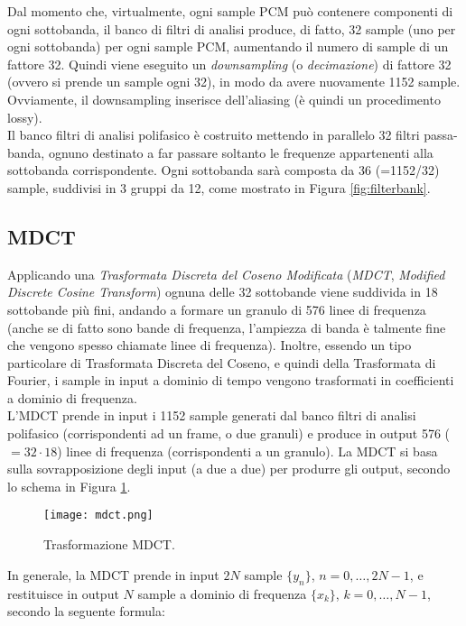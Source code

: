 			Dal momento che, virtualmente, ogni sample PCM può contenere componenti di ogni sottobanda, il banco di filtri di analisi produce, di fatto, 32 sample (uno per ogni sottobanda) per ogni sample PCM, aumentando il numero di sample di un fattore 32. Quindi viene eseguito un \textit{downsampling} (o \textit{decimazione}) di fattore 32 (ovvero si prende un sample ogni 32), in modo da avere nuovamente 1152 sample. Ovviamente, il downsampling inserisce dell'aliasing (è quindi un procedimento lossy).\\
			Il banco filtri di analisi polifasico è costruito mettendo in parallelo 32 filtri passa-banda, ognuno destinato a far passare soltanto le frequenze appartenenti alla sottobanda corrispondente. Ogni sottobanda sarà composta da 36 (=1152/32) sample, suddivisi in 3 gruppi da 12, come mostrato in Figura \ref{fig:filterbank}.
		
		\subsection{MDCT} \label{subsec:MDCT}
		
			Applicando una \textit{Trasformata Discreta del Coseno Modificata} (\textit{MDCT}, \textit{Modified Discrete Cosine Transform}) ognuna delle 32 sottobande viene suddivida in 18 sottobande più fini, andando a formare un granulo di 576 linee di frequenza (anche se di fatto sono bande di frequenza, l'ampiezza di banda è talmente fine che vengono spesso chiamate linee di frequenza). Inoltre, essendo un tipo particolare di Trasformata Discreta del Coseno, e quindi della Trasformata di Fourier, i sample in input a dominio di tempo vengono trasformati in coefficienti a dominio di frequenza.\\
			L'MDCT prende in input i 1152 sample generati dal banco filtri di analisi polifasico (corrispondenti ad un frame, o due granuli) e produce in output 576 ($=32\cdot 18$) linee di frequenza (corrispondenti a un granulo). La MDCT si basa sulla sovrapposizione degli input (a due a due) per produrre gli output, secondo lo schema in Figura \ref{fig:mdct}.\\
			
			\begin{figure}[h!]
				\centering
					\texttt{[image: mdct.png]}
				\caption{Trasformazione MDCT.}
				\label{fig:mdct}
			\end{figure}
			
			In generale, la MDCT prende in input $2N$ sample $\{y_n\}$, $n=0,\dots,2N-1$, e restituisce in output $N$ sample a dominio di frequenza $\{x_k\}$, $k=0,\dots,N-1$, secondo la seguente formula:
			
